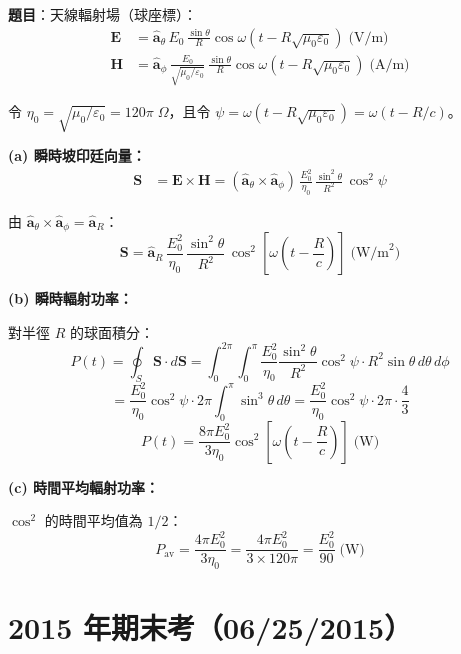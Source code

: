 \documentclass[12pt,a4paper]{article}
\newcommand{\vE}{\mathbf{E}}
\newcommand{\vH}{\mathbf{H}}
\newcommand{\vS}{\mathbf{S}}
\newcommand{\aR}{\hat{\mathbf{a}}_R}
\newcommand{\ath}{\hat{\mathbf{a}}_\theta}
\newcommand{\aph}{\hat{\mathbf{a}}_\phi}
\begin{document}
\textbf{題目}：天線輻射場（球座標）：
\begin{align*}
  \vE &= \ath\,E_0\,\frac{\sin\theta}{R}\cos\omega\!\left(t - R\sqrt{\mu_0\varepsilon_0}\right) \;\text{(V/m)} \\
  \vH &= \aph\,\frac{E_0}{\sqrt{\mu_0/\varepsilon_0}}\,\frac{\sin\theta}{R}\cos\omega\!\left(t - R\sqrt{\mu_0\varepsilon_0}\right) \;\text{(A/m)}
\end{align*}

\begin{solutionbox}[詳解]

令 $\eta_0 = \sqrt{\mu_0/\varepsilon_0} = 120\pi\;\Omega$，且令 $\psi = \omega(t - R\sqrt{\mu_0\varepsilon_0}) = \omega(t - R/c)$。

\textbf{(a) 瞬時坡印廷向量：}
\begin{align*}
  \vS &= \vE \times \vH = \left(\ath \times \aph\right)\,\frac{E_0^2}{\eta_0}\,\frac{\sin^2\theta}{R^2}\,\cos^2\psi
\end{align*}

由 $\ath \times \aph = \aR$：
\[
  \boxed{\vS = \aR\,\frac{E_0^2}{\eta_0}\,\frac{\sin^2\theta}{R^2}\,\cos^2\!\left[\omega\!\left(t - \frac{R}{c}\right)\right] \;\text{(W/m}^2\text{)}}
\]

\textbf{(b) 瞬時輻射功率：}

對半徑 $R$ 的球面積分：
\[
  P(t) = \oint_S \vS \cdot d\vS = \int_0^{2\pi}\!\int_0^{\pi}
  \frac{E_0^2}{\eta_0}\frac{\sin^2\theta}{R^2}\cos^2\psi \cdot R^2\sin\theta\,d\theta\,d\phi
\]
\[
  = \frac{E_0^2}{\eta_0}\cos^2\psi \cdot 2\pi \int_0^{\pi}\sin^3\theta\,d\theta
  = \frac{E_0^2}{\eta_0}\cos^2\psi \cdot 2\pi \cdot \frac{4}{3}
\]
\[
  \boxed{P(t) = \frac{8\pi E_0^2}{3\eta_0}\cos^2\!\left[\omega\!\left(t - \frac{R}{c}\right)\right] \;\text{(W)}}
\]

\textbf{(c) 時間平均輻射功率：}

$\cos^2$ 的時間平均值為 $1/2$：
\[
  \boxed{P_{\text{av}} = \frac{4\pi E_0^2}{3\eta_0} = \frac{4\pi E_0^2}{3 \times 120\pi} = \frac{E_0^2}{90} \;\text{(W)}}
\]
\end{solutionbox}

\newpage
\part{2015 年期末考（06/25/2015）}
\end{document}
